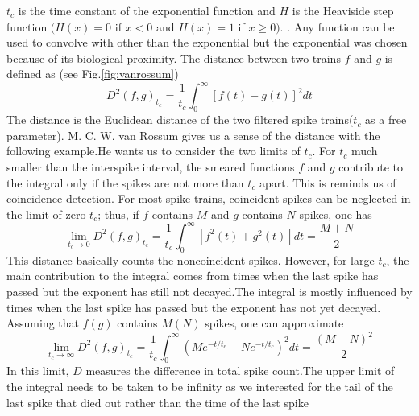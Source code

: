\documentclass[12pt]{report}
\begin{document}
$t_{c}$ is the time constant of the exponential function and $H$ is the Heaviside step function $(H(x)=0$ if $x<0$ and $H(x)=1$ if $x \geq 0) .$ . Any function can be used to convolve with other than the exponential but the exponential was chosen because of its biological proximity. The distance between two trains $f$ and $g$ is defined as (see Fig.\ref{fig:vanrossum})
\begin{equation}
D^{2}(f, g)_{t_{c}}=\frac{1}{t_{c}} \int_{0}^{\infty}[f(t)-g(t)]^{2} d t
\end{equation}
The distance is the Euclidean distance of the two filtered spike trains($t_{c}$ as a free parameter).
M. C. W. van Rossum gives us a sense of the distance with the following example.He wants us to consider the two limits of $t_{c} .$ For $t_{c}$ much smaller than the interspike interval, the smeared functions $f$ and $g$ contribute to the integral only if the spikes are not more than $t_{c}$ apart. This is reminds us of coincidence detection. For most spike trains, coincident spikes can be neglected in the limit of zero $t_{c}$; thus, if $f$ contains $M$ and $g$ contains $N$ spikes, one has
\begin{equation}
\lim _{t_{c} \rightarrow 0} D^{2}(f, g)_{t_{c}}=\frac{1}{t_{c}} \int_{0}^{\infty}\left[f^{2}(t)+g^{2}(t)\right] d t=\frac{M+N}{2}
\end{equation}
This distance basically counts the noncoincident spikes.
However, for large $t_{c}$, the main contribution to the integral comes from times when the last spike has passed but the exponent has still not decayed.The integral is mostly influenced by times when the last spike has passed but the exponent has not yet decayed. Assuming that $f(g)$ contains $M(N)$ spikes, one can approximate
\begin{equation}
\lim _{t_{c} \rightarrow \infty} D^{2}(f, g)_{t_{c}}=\frac{1}{t_{c}} \int_{0}^{\infty}\left(M e^{-t / t_{\mathrm{c}}}-N e^{-t / t_{c}}\right)^{2} d t=\frac{(M-N)^{2}}{2}
\end{equation}
In this limit, $D$ measures the difference in total spike count.The upper limit of the integral needs to be taken to be infinity as we interested for the tail of the last spike that died out rather than the time of the last spike
\end{document}
